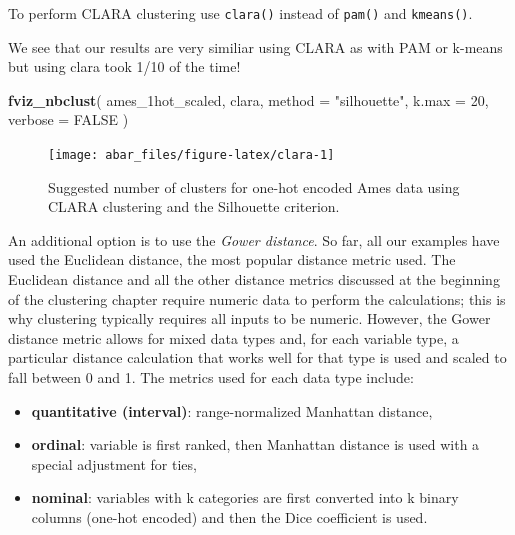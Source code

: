 \documentclass[]{book}
\newenvironment{Shaded}{\begin{snugshade}}{\end{snugshade}}
\newcommand{\DataTypeTok}[1]{\textcolor[rgb]{0.13,0.29,0.53}{#1}}
\newcommand{\DecValTok}[1]{\textcolor[rgb]{0.00,0.00,0.81}{#1}}
\newcommand{\KeywordTok}[1]{\textcolor[rgb]{0.13,0.29,0.53}{\textbf{#1}}}
\newcommand{\NormalTok}[1]{#1}
\newcommand{\OtherTok}[1]{\textcolor[rgb]{0.56,0.35,0.01}{#1}}
\newcommand{\StringTok}[1]{\textcolor[rgb]{0.31,0.60,0.02}{#1}}
\providecommand{\tightlist}{%
  \setlength{\itemsep}{0pt}\setlength{\parskip}{0pt}}
\theoremstyle{definition}
\theoremstyle{definition}
\theoremstyle{definition}
\theoremstyle{remark}
\let\BeginKnitrBlock\begin \let\EndKnitrBlock\end
\begin{document}
\BeginKnitrBlock{tip}
To perform CLARA clustering use \texttt{clara()} instead of
\texttt{pam()} and \texttt{kmeans()}.
\EndKnitrBlock{tip}

We see that our results are very similiar using CLARA as with PAM or
k-means but using clara took 1/10 of the time!

\begin{Shaded}
\begin{Highlighting}[]
\KeywordTok{fviz_nbclust}\NormalTok{(}
\NormalTok{  ames_1hot_scaled, }
\NormalTok{  clara, }
  \DataTypeTok{method =} \StringTok{"silhouette"}\NormalTok{, }
  \DataTypeTok{k.max =} \DecValTok{20}\NormalTok{, }
  \DataTypeTok{verbose =} \OtherTok{FALSE}
\NormalTok{  )}
\end{Highlighting}
\end{Shaded}

\begin{figure}

{\centering \texttt{[image: abar\_files/figure-latex/clara-1]} 

}

\caption{Suggested number of clusters for one-hot encoded Ames data using CLARA clustering and the Silhouette criterion.}\label{fig:clara}
\end{figure}

An additional option is to use the \emph{Gower distance}. So far, all
our examples have used the Euclidean distance, the most popular distance
metric used. The Euclidean distance and all the other distance metrics
discussed at the beginning of the clustering chapter require numeric
data to perform the calculations; this is why clustering typically
requires all inputs to be numeric. However, the Gower distance metric
allows for mixed data types and, for each variable type, a particular
distance calculation that works well for that type is used and scaled to
fall between 0 and 1. The metrics used for each data type include:

\begin{itemize}
\tightlist
\item
  \textbf{quantitative (interval)}: range-normalized Manhattan distance,
\item
  \textbf{ordinal}: variable is first ranked, then Manhattan distance is
  used with a special adjustment for ties,
\item
  \textbf{nominal}: variables with k categories are first converted into
  k binary columns (one-hot encoded) and then the Dice coefficient is
  used.
\end{itemize}
\end{document}
